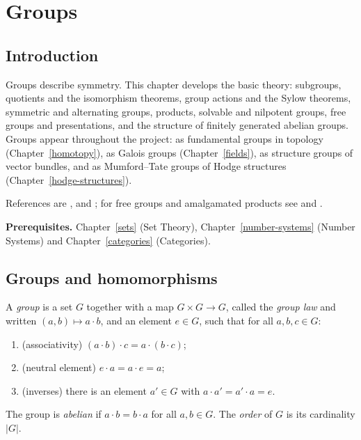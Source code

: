 \chapter{Groups}\label{groups}

\section{Introduction}\label{groups:section-introduction}

Groups describe symmetry. This chapter develops the basic theory: subgroups,
quotients and the isomorphism theorems, group actions and the Sylow theorems,
symmetric and alternating groups, products, solvable and nilpotent groups,
free groups and presentations, and the structure of finitely generated
abelian groups. Groups appear throughout the project: as fundamental groups
in topology (Chapter~\ref{homotopy}), as Galois groups
(Chapter~\ref{fields}), as structure groups of vector bundles, and as
Mumford--Tate groups of Hodge structures (Chapter~\ref{hodge-structures}).

References are \cite{lang-algebra}, \cite{rotman-groups} and
\cite{dummit-foote}; for free groups and amalgamated products see
\cite{serre-trees} and \cite{lyndon-schupp}.

\noindent\textbf{Prerequisites.} Chapter~\ref{sets} (Set Theory),
Chapter~\ref{number-systems} (Number Systems) and Chapter~\ref{categories}
(Categories).

\section{Groups and homomorphisms}\label{groups:section-groups}

\begin{definition}\label{groups:definition-group}
A \emph{group} is a set $G$ together with a map $G \times G \to G$, called the
\emph{group law} and written $(a, b) \mapsto a \cdot b$, and an element $e \in G$, such that
for all $a, b, c \in G$:
\begin{enumerate}
\item (associativity) $(a \cdot b) \cdot c = a \cdot (b \cdot c)$;
\item (neutral element) $e \cdot a = a \cdot e = a$;
\item (inverses) there is an element $a' \in G$ with $a \cdot a' = a' \cdot a = e$.
\end{enumerate}
The group is \emph{abelian} if $a \cdot b = b \cdot a$ for all $a, b \in G$. The \emph{order}
of $G$ is its cardinality $|G|$.
\end{definition}

